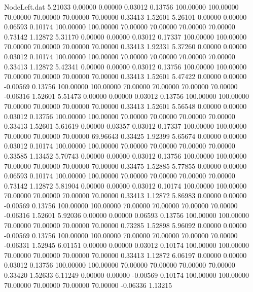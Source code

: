 \begin{filecontents}{NodeLeft.dat}
   5.21033    0.00000    0.00000     0.03012    0.13756  100.00000  100.00000   70.00000   70.00000   70.00000   70.00000    0.33413    1.52601
   5.26101    0.00000    0.00000     0.06593    0.10174  100.00000  100.00000   70.00000   70.00000   70.00000   70.00000    0.73142    1.12872
   5.31170    0.00000    0.00000     0.03012    0.17337  100.00000  100.00000   70.00000   70.00000   70.00000   70.00000    0.33413    1.92331
   5.37260    0.00000    0.00000     0.03012    0.10174  100.00000  100.00000   70.00000   70.00000   70.00000   70.00000    0.33413    1.12872
   5.42341    0.00000    0.00000     0.03012    0.13756  100.00000  100.00000   70.00000   70.00000   70.00000   70.00000    0.33413    1.52601
   5.47422    0.00000    0.00000    -0.00569    0.13756  100.00000  100.00000   70.00000   70.00000   70.00000   70.00000   -0.06316    1.52601
   5.51473    0.00000    0.00000     0.03012    0.13756  100.00000  100.00000   70.00000   70.00000   70.00000   70.00000    0.33413    1.52601
   5.56548    0.00000    0.00000     0.03012    0.13756  100.00000  100.00000   70.00000   70.00000   70.00000   70.00000    0.33413    1.52601
   5.61619    0.00000    0.03357     0.03012    0.17337  100.00000  100.00000   70.00000   70.00000   70.00000   69.96643    0.33425    1.92399
   5.65674    0.00000    0.00000     0.03012    0.10174  100.00000  100.00000   70.00000   70.00000   70.00000   70.00000    0.33585    1.13452
   5.70743    0.00000    0.00000     0.03012    0.13756  100.00000  100.00000   70.00000   70.00000   70.00000   70.00000    0.33475    1.52885
   5.77855    0.00000    0.00000     0.06593    0.10174  100.00000  100.00000   70.00000   70.00000   70.00000   70.00000    0.73142    1.12872
   5.81904    0.00000    0.00000     0.03012    0.10174  100.00000  100.00000   70.00000   70.00000   70.00000   70.00000    0.33413    1.12872
   5.86983    0.00000    0.00000    -0.00569    0.13756  100.00000  100.00000   70.00000   70.00000   70.00000   70.00000   -0.06316    1.52601
   5.92036    0.00000    0.00000     0.06593    0.13756  100.00000  100.00000   70.00000   70.00000   70.00000   70.00000    0.73285    1.52898
   5.96092    0.00000    0.00000    -0.00569    0.13756  100.00000  100.00000   70.00000   70.00000   70.00000   70.00000   -0.06331    1.52945
   6.01151    0.00000    0.00000     0.03012    0.10174  100.00000  100.00000   70.00000   70.00000   70.00000   70.00000    0.33413    1.12872
   6.06197    0.00000    0.00000     0.03012    0.13756  100.00000  100.00000   70.00000   70.00000   70.00000   70.00000    0.33420    1.52633
   6.11249    0.00000    0.00000    -0.00569    0.10174  100.00000  100.00000   70.00000   70.00000   70.00000   70.00000   -0.06336    1.13215

\end{filecontents}
